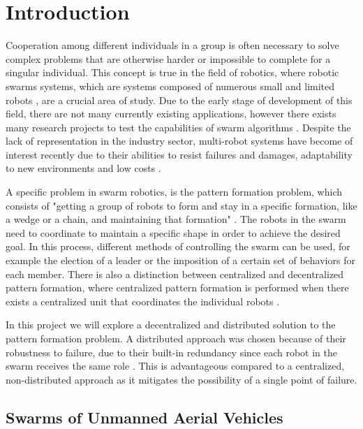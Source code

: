 \tableofcontents

\listoffigures

\listofalgorithms

\chapter{Introduction}

Cooperation among different individuals in a group is often necessary to solve complex problems
that are otherwise harder or impossible to complete for a singular individual. This concept is
true in the field of robotics, where robotic swarms systems, which are systems composed of
numerous small and limited robots \autocite{HO17}, are a crucial area of study. Due to the early
stage of development of this field, there are not many currently existing applications, however
there exists many research projects to test the capabilities of swarm algorithms \autocite{MS20}.
Despite the lack of representation in the industry sector, multi-robot systems have become of
interest recently due to their abilities to resist failures and damages, adaptability to new
environments and low costs \autocite{HO17}.

A specific problem in swarm robotics, is the pattern formation problem, which consists of
"getting a group of robots to form and stay in a specific formation, like a wedge or a chain,
and maintaining that formation" \autocite{LS22}. The robots in the swarm need to coordinate
to maintain a specific shape in order to achieve the desired goal. In this process, different
methods of controlling the swarm can be used, for example the election of a leader or the 
imposition of a certain set of behaviors for each member. There is also a 
distinction between centralized and decentralized pattern formation, where centralized pattern
formation is performed when there exists a centralized unit that coordinates the individual
robots \autocite{HO17}.

In this project we will explore a decentralized and distributed solution to the pattern formation problem.
A distributed approach was chosen because of their robustness to failure, due to their
built-in redundancy since each robot in the swarm receives the same role \autocite{HO17}.
This is advantageous compared to a centralized, non-distributed approach as it
mitigates the possibility of a single point of failure.


\section{Swarms of Unmanned Aerial Vehicles}

